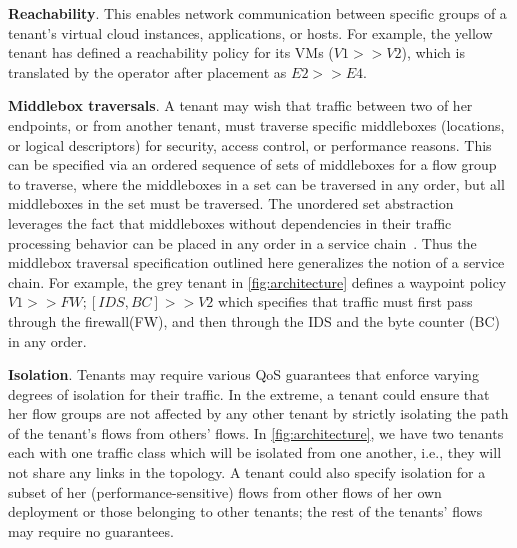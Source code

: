 \begin{compactitemize}
\item \textbf{Reachability}. This enables network communication
  between specific groups of a tenant's virtual cloud instances,
  applications, or hosts. For example, the yellow tenant has defined a reachability
  policy for its VMs ($V1 >> V2$), which is translated by the operator after 
  placement as $E2 >> E4$.
\item \textbf{Middlebox traversals}. A tenant may wish that traffic
  between two of her endpoints, or from another tenant, must traverse
   specific middleboxes (locations, or logical descriptors) for
  security, access control, or performance reasons. This can be
  specified via an ordered sequence of sets of middleboxes for a flow
  group  to traverse, where the middleboxes in a set can be traversed
  in any order, but all middleboxes in the set must be traversed.  The
  unordered set abstraction leverages the fact that middleboxes
  without dependencies in their traffic processing behavior can be
  placed in any order in a service chain~\cite{pga}. Thus the
  middlebox traversal specification outlined here generalizes the
  notion of a service chain. For example, the grey tenant in \cref{fig:architecture}
  defines a waypoint policy $V1 >> FW; [IDS,BC] >> V2$
   which specifies that traffic must first pass through the firewall(FW),
  and then through the IDS and the byte counter (BC) in any order. 


\item \textbf{Isolation}. Tenants may require various QoS guarantees
  that enforce varying degrees of isolation for their traffic. In the
  extreme, a tenant could ensure that her flow groups are not affected
  by any other tenant by strictly isolating the path of the tenant's
  flows from others' flows. In \cref{fig:architecture}, we have two tenants
  each with one traffic class which will be isolated from one another, i.e.,
  they will not share any links in the topology. 
  A tenant could also specify isolation for a subset of her
  (performance-sensitive) flows from other flows of her own deployment
  or those belonging to other tenants; the rest of the tenants' flows
  may require no guarantees.


\end{compactitemize}
